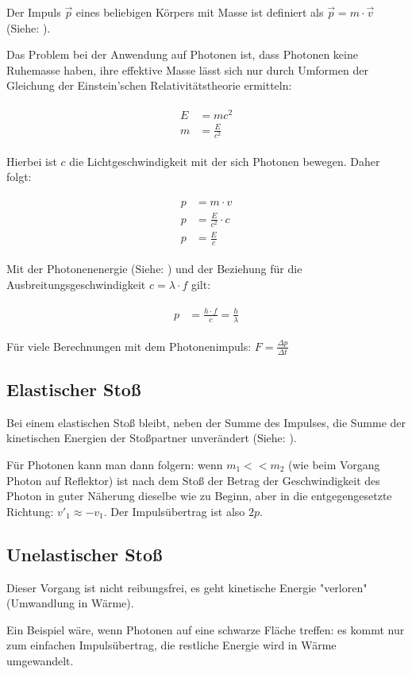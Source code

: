 Der Impuls $\vec{p}$ eines beliebigen Körpers mit Masse ist definiert als $\vec{p} = m \cdot \vec{v}$ (Siehe: ). 

Das Problem bei der Anwendung auf Photonen ist, dass Photonen keine Ruhemasse haben, ihre effektive Masse lässt sich nur durch Umformen der Gleichung der Einstein'schen Relativitätstheorie ermitteln:

\begin{align}
\begin{split}
	E &= mc^2 \\
	m &= \frac{E}{c^2}
\end{split}
\end{align}

\noindent Hierbei ist $c$ die Lichtgeschwindigkeit mit der sich Photonen bewegen. Daher folgt:

\begin{align}
\begin{split}
	p &= m \cdot v \\
	p &= \frac{E}{c^2} \cdot c \\
	p &= \frac{E}{c}
\end{split}
\end{align}

\noindent Mit der Photonenenergie (Siehe: ) und der Beziehung für die Ausbreitungsgeschwindigkeit $c=\lambda \cdot f$ gilt:

\begin{align}	\label{eq:Photonenimpuls}
\begin{split}
	p &= \frac{h \cdot f}{c} = \frac{h}{\lambda}
\end{split}
\end{align}

\begin{NiceToKnow}
	Für viele Berechnungen mit dem Photonenimpuls: $F = \frac{\Delta p}{\Delta t}$
\end{NiceToKnow}


\subsection{Elastischer Stoß}

Bei einem elastischen Stoß bleibt, neben der Summe des Impulses, die Summe der kinetischen Energien der Stoßpartner unverändert (Siehe: ).

Für Photonen kann man dann folgern: wenn $m_1 << m_2$ (wie beim Vorgang Photon auf Reflektor) ist nach dem Stoß der Betrag der Geschwindigkeit des Photon in guter Näherung dieselbe wie zu Beginn, aber in die entgegengesetzte Richtung: $v'_1 \approx -v_1$. Der Impulsübertrag ist also $2p$.


\subsection{Unelastischer Stoß}

Dieser Vorgang ist nicht reibungsfrei, es geht kinetische Energie "verloren" (Umwandlung in Wärme).

Ein Beispiel wäre, wenn Photonen auf eine schwarze Fläche treffen: es kommt nur zum einfachen Impulsübertrag, die restliche Energie wird in Wärme umgewandelt.


